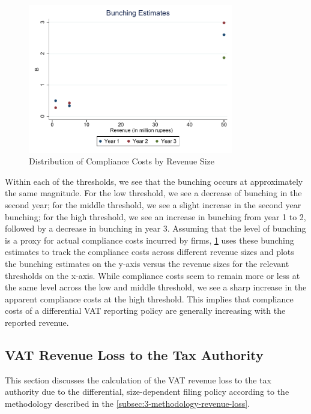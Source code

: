 \begin{figure}[t]
  \caption{Distribution of Compliance Costs by Revenue Size}
  \label{fig:ComplianceCosts}
  \includegraphics[width=0.8\textwidth]{graphs/BunchingEstimates} 
\end{figure}

Within each of the thresholds, we see that the bunching occurs at approximately the same magnitude. For the low threshold, we see a decrease of bunching in the second year; for the middle threshold, we see a slight increase in the second year bunching; for the high
threshold, we see an increase in bunching from year 1 to 2, followed by a decrease in bunching in year 3. Assuming that the level of bunching is a proxy for actual compliance costs incurred by firms, \cref{fig:ComplianceCosts} uses these bunching estimates to track the compliance costs across different revenue sizes and plots the bunching estimates on the y-axis versus the revenue sizes for the relevant thresholds on the x-axis. While compliance costs seem to remain more or less at the same level across the low and middle threshold, we see a sharp increase in the apparent compliance costs at the high threshold. This implies that compliance costs of a differential VAT reporting policy are generally increasing with the reported revenue.

\subsection{VAT Revenue Loss to the Tax Authority}
\label{subsec:3-results-revenue-loss}
This section discusses the calculation of the VAT revenue loss to the tax authority due to the differential, size-dependent filing policy according to the methodology described in the \cref{subsec:3-methodology-revenue-loss}.

